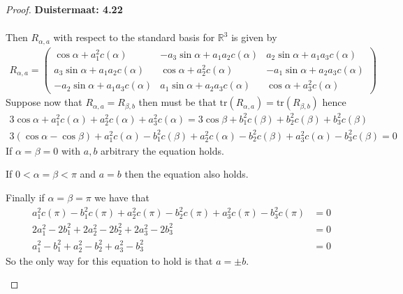 \documentclass[11pt]{article}
\newcommand{\R}{\mathbb{R}}
\newcommand{\tr}{\text{tr}}
\theoremstyle{definition}
\begin{document}
\begin{proof}{\textbf{Duistermaat: 4.22}}
\begin{itemize}
\begin{align*}
    \end{align*}
    Then $R_{\alpha, a}$ with respect to the standard basis for $\R^3$ is
    given by
    \begin{align*}
        R_{\alpha, a} = \begin{pmatrix}
            \cos\alpha + a_1^2c(\alpha)
            & -a_3\sin\alpha + a_1a_2c(\alpha)
            & a_2\sin\alpha + a_1a_3c(\alpha) \\
            a_3\sin\alpha + a_1a_2c(\alpha)
            & \cos\alpha + a_2^2c(\alpha)
            & -a_1\sin\alpha + a_2a_3c(\alpha) \\
            -a_2\sin\alpha + a_1a_3c(\alpha)
            & a_1\sin\alpha + a_2a_3c(\alpha)
            & \cos\alpha + a_3^2c(\alpha)
        \end{pmatrix}
    \end{align*}
    Suppose now that $R_{\alpha, a} = R_{\beta, b}$ then must be that
    $\tr(R_{\alpha, a}) = \tr(R_{\beta, b})$ hence
    \begin{align*}
        3\cos\alpha + a_1^2c(\alpha) + a_2^2c(\alpha) + a_3^2c(\alpha)
        = 3\cos\beta + b_1^2c(\beta) + b_2^2c(\beta) + b_3^2c(\beta)\\
        3(\cos\alpha - \cos\beta) + a_1^2c(\alpha) - b_1^2c(\beta)
        + a_2^2c(\alpha) - b_2^2c(\beta) + a_3^2c(\alpha) - b_3^2c(\beta)
        =  0
    \end{align*}
    If $\alpha = \beta = 0$ with $a,b$ arbitrary the equation holds.

    If $0 < \alpha = \beta < \pi$ and $a = b$ then the equation also holds.

    Finally if $\alpha = \beta = \pi$ we have that
    \begin{align*}
        a_1^2c(\pi) - b_1^2c(\pi) + a_2^2c(\pi) - b_2^2c(\pi)
        + a_3^2c(\pi) - b_3^2c(\pi) &= 0\\
        2a_1^2 - 2b_1^2 + 2a_2^2 - 2b_2^2 + 2a_3^2 - 2b_3^2 &= 0\\
        a_1^2 - b_1^2 + a_2^2 - b_2^2 + a_3^2 - b_3^2 &= 0
    \end{align*}
    So the only way for this equation to hold is that $a = \pm b$.


\end{itemize}
\end{proof}
\end{document}
